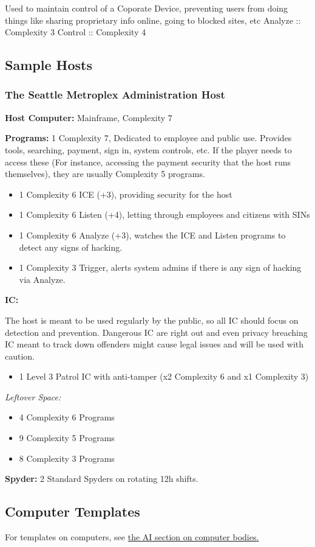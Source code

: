 \begin{multicols}{2}
	Used to maintain control of a Coporate Device, preventing users from doing things like sharing proprietary info online, going to blocked sites, etc
	Analyze :: Complexity 3
	Control :: Complexity 4

	
	\subsection{Sample Hosts}
	
	\subsubsection{The Seattle Metroplex Administration Host}
	
	\hspace{\parindent}\textbf{Host Computer:} Mainframe, Complexity 7
	
	\textbf{Programs:}
	1 Complexity 7, Dedicated to employee and public use. Provides tools, searching, payment, sign in, system controls, etc. If the player needs to access these (For instance, accessing the payment security that the host runs themselves), they are usually Complexity 5 programs.
	
	\begin{itemize}
		\itemsep 0pt
		\item 1 Complexity 6 ICE (+3), providing security for the host
		\item 1 Complexity 6 Listen (+4), letting through employees and citizens with SINs
		\item 1 Complexity 6 Analyze (+3), watches the ICE and Listen programs to detect any signs of hacking.
		\item 1 Complexity 3 Trigger, alerts system admins if there is any sign of hacking via Analyze.
	\end{itemize}

	\textbf{IC:}
	
	The host is meant to be used regularly by the public, so all IC should focus on detection and prevention. Dangerous IC are right out and even privacy breaching IC meant to track down offenders might cause legal issues and will be used with caution.
	
	\begin{itemize}
		\itemsep 0pt
		\item 1 Level 3 Patrol IC with anti-tamper (x2 Complexity 6 and x1 Complexity 3)
	\end{itemize}
	
	
	\textit{Leftover Space:}
	\begin{itemize}
		\itemsep 0pt
		\item 4 Complexity 6 Programs
		\item 9 Complexity 5 Programs
		\item 8 Complexity 3 Programs
	\end{itemize}
	
	\textbf{Spyder:}
	2 Standard Spyders on rotating 12h shifts.
	
	
	\subsection*{Computer Templates}
	
	For templates on computers, see \hyperref[ai_computer]{the AI section on computer bodies.}
	
\end{multicols}